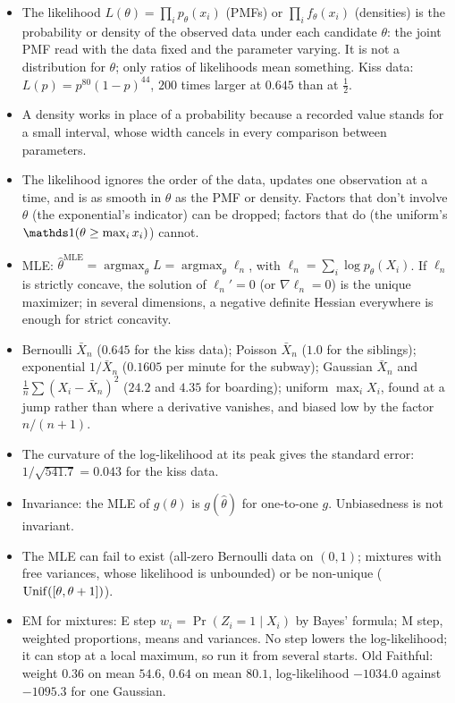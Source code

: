 \begin{itemize}[nosep]
\item The likelihood $L(\theta) = \prod_i p_\theta(x_i)$ (PMFs) or $\prod_i f_\theta(x_i)$ (densities) is the probability or density of the observed data under each candidate $\theta$: the joint PMF read with the data fixed and the parameter varying. It is not a distribution for $\theta$; only ratios of likelihoods mean something. Kiss data: $L(p) = p^{80}(1 - p)^{44}$, $200$ times larger at $0.645$ than at $\frac12$.
\item A density works in place of a probability because a recorded value stands for a small interval, whose width cancels in every comparison between parameters.
\item The likelihood ignores the order of the data, updates one observation at a time, and is as smooth in $\theta$ as the PMF or density. Factors that don't involve $\theta$ (the exponential's indicator) can be dropped; factors that do (the uniform's $\ind(\theta \geq \max_i x_i)$) cannot.
\item MLE: $\hat{\theta}^{\text{MLE}} = \operatorname{argmax}_\theta L = \operatorname{argmax}_\theta \ell_n$, with $\ell_n = \sum_i \log p_\theta(X_i)$. If $\ell_n$ is strictly concave, the solution of $\ell_n' = 0$ (or $\nabla\ell_n = 0$) is the unique maximizer; in several dimensions, a negative definite Hessian everywhere is enough for strict concavity.
\item Bernoulli $\bar{X}_n$ ($0.645$ for the kiss data); Poisson $\bar{X}_n$ ($1.0$ for the siblings); exponential $1/\bar{X}_n$ ($0.1605$ per minute for the subway); Gaussian $\bar{X}_n$ and $\frac1n\sum(X_i - \bar{X}_n)^2$ ($24.2$ and $4.35$ for boarding); uniform $\max_i X_i$, found at a jump rather than where a derivative vanishes, and biased low by the factor $n/(n+1)$.
\item The curvature of the log-likelihood at its peak gives the standard error: $1/\sqrt{541.7} = 0.043$ for the kiss data.
\item Invariance: the MLE of $g(\theta)$ is $g(\hat{\theta})$ for one-to-one $g$. Unbiasedness is not invariant.
\item The MLE can fail to exist (all-zero Bernoulli data on $(0, 1)$; mixtures with free variances, whose likelihood is unbounded) or be non-unique ($\mathrm{Unif}([\theta, \theta+1])$).
\item EM for mixtures: E step $w_i = \Pr(Z_i = 1 \mid X_i)$ by Bayes' formula; M step, weighted proportions, means and variances. No step lowers the log-likelihood; it can stop at a local maximum, so run it from several starts. Old Faithful: weight $0.36$ on mean $54.6$, $0.64$ on mean $80.1$, log-likelihood $-1034.0$ against $-1095.3$ for one Gaussian.
\end{itemize}

